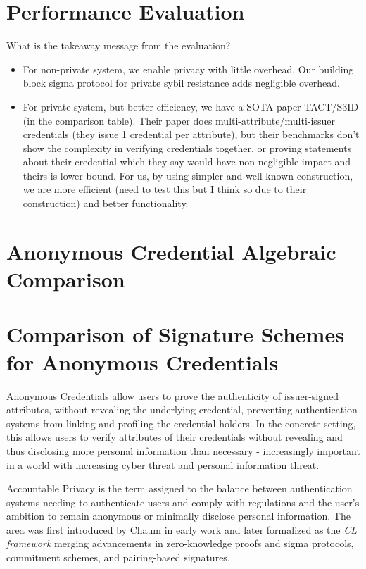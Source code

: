 {\section{Performance Evaluation}\label{sec:evaluation}
What is the takeaway message from the evaluation?
\begin{itemize}
    \item For non-private system, we enable privacy with little overhead. Our building block sigma protocol for private sybil resistance adds negligible overhead. 
    \item For private system, but better efficiency, we have a SOTA paper TACT/S3ID (in the comparison table). Their paper does multi-attribute/multi-issuer credentials (they issue 1 credential per attribute), but their benchmarks don't show the complexity in verifying credentials together, or proving statements about their credential which they say would have non-negligible impact and theirs is lower bound. For us, by using simpler and well-known construction, we are more efficient (need to test this but I think so due to their construction) and better functionality. 
\end{itemize}








\newpage
\section{Anonymous Credential Algebraic Comparison}

\section{Comparison of Signature Schemes for Anonymous Credentials}
\label{sec:signature-comparison}

Anonymous Credentials allow users to prove the authenticity of issuer-signed attributes, without revealing the underlying credential, preventing authentication systems from linking and profiling the credential holders. In the concrete setting, this allows users to verify attributes of their credentials without revealing and thus disclosing more personal information than necessary - increasingly important in a world with increasing cyber threat and personal information threat. 

Accountable Privacy is the term assigned to the balance between authentication systems needing to authenticate users and comply with regulations and the user's ambition to remain anonymous or minimally disclose personal information. The area was first introduced by Chaum in early work \cite{chaum_untraceable_1981, chaum1985security} and later formalized as the \emph{CL framework} \cite{goos_pseudonym_2000, goos_efficient_2001} merging advancements in zero-knowledge proofs and sigma protocols, commitment schemes, and pairing-based signatures. 

}
